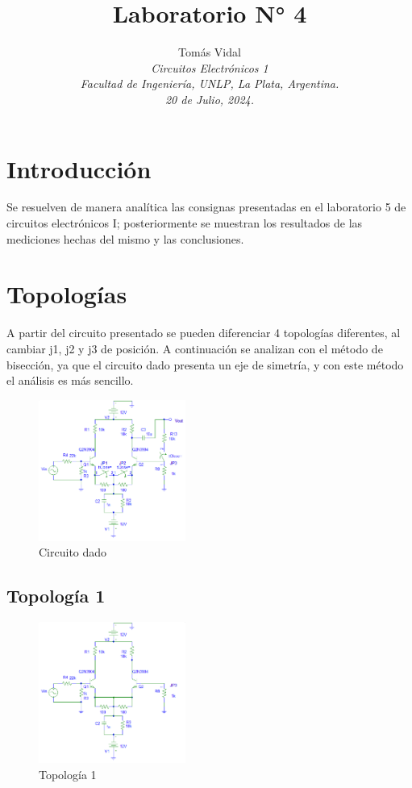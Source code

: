 \documentclass[letterpaper, 10 pt, conference]{ieeeconf}  %
\title{\LARGE \bf Laboratorio N° 4}
\author{
  Tom\'as Vidal\\
  {\it Circuitos Electrónicos 1}\\
  {\it Facultad de Ingenier\'ia, UNLP, La Plata, Argentina.}\\
  {\it 20 de Julio, 2024.}
}                                            %
\begin{document}
\maketitle
\thispagestyle{empty}
\pagestyle{empty}

\section{Introducción}
Se resuelven de manera analítica las consignas presentadas en el laboratorio 5 de circuitos electrónicos I; posteriormente se muestran los resultados de las mediciones hechas del mismo y las conclusiones.

\section{Topologías}
A partir del circuito presentado se pueden diferenciar 4 topologías diferentes, al cambiar j1, j2 y j3 de posición. A continuación se analizan con el método de bisección, ya que el circuito dado presenta un eje de simetría, y con este método el análisis es más sencillo.

\begin{figure}[H]
 \centering
 \includegraphics[width=0.43\textwidth]{./Imagenes/circuito_presentado.png}
 \caption{Circuito dado}
 \label{pic:circuito_presentado}
\end{figure}

\subsection{Topología 1}

\begin{figure}[H]
 \centering
 \includegraphics[width=0.43\textwidth]{./Imagenes/topologia1.png}
 \caption{Topología 1}
 \label{pic:topologia1}
\end{figure}
\end{document}
